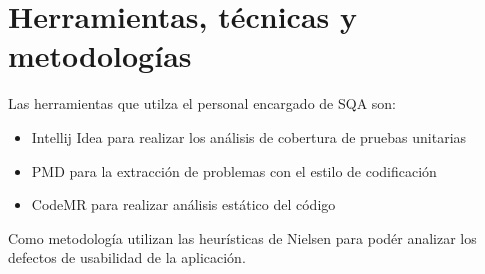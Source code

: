 

\section{Herramientas, técnicas y metodologías}

Las herramientas que utilza el personal encargado de SQA son:
\begin{itemize}
    \item Intellij Idea para realizar los análisis de cobertura de pruebas unitarias
    \item PMD para la extracción de problemas con el estilo de codificación
    \item CodeMR para realizar análisis estático del código
\end{itemize}

Como metodología utilizan las heurísticas de Nielsen para podér analizar los defectos de usabilidad de la aplicación.

\begin{comment}
Describir el plan de calidad.
Máximo: 1 página.


1.
propósito y alcance del plan.
2.
descripción de los productos del trabajo (modelos, documentos,
código fuente, etc.) que se ubiquen dentro del ámbito del QA.
3.
estándares y prácticas aplicables que se utilicen durante el proceso
del software.
4.
acciones y tareas de QA (incluidas revisiones y auditorías) y su
ubicación en el proceso del software.
5.
herramientas y métodos que den apoyo a las acciones y tareas de
ACS (aseguramiento de la calidad del software).
6.
procedimientos para la administración de la configuración del
software.
7.
métodos para mantener todos los registros relacionados con QA.
8.
roles y responsabilidades relacionados con la función de calidad.

IEEE Std 730-1998
a) Purpose;
b) Reference documents;
c) Management;
d) Documentation;
e) Standards, practices, conventions, and metrics;
f) Reviews and audits;
g) Test;
h) Problem reporting and corrective action;
i) Tools, techniques, and methodologies;
j) Code control;
k) Media control;
l) Supplier control;
m) Records collection, maintenance, and retention;
n) Training;
o) Risk management.
\end{comment}